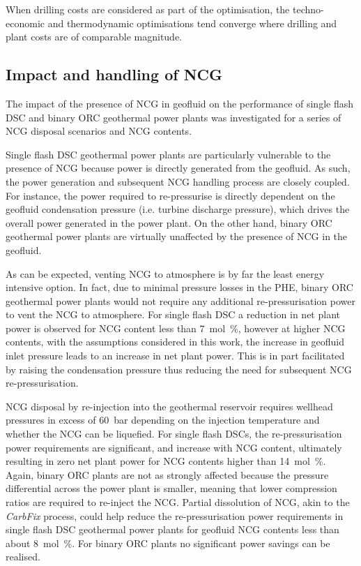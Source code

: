         When drilling costs are considered as part of the optimisation, the techno-economic and thermodynamic optimisations tend converge where drilling and plant costs are of comparable magnitude.
    
    \subsection{Impact and handling of NCG}
        The impact of the presence of \ac{NCG} in geofluid on the performance of single flash \ac{DSC} and binary \ac{ORC} geothermal power plants was investigated for a series of \ac{NCG} disposal scenarios and \ac{NCG} contents.

        Single flash \ac{DSC} geothermal power plants are particularly vulnerable to the presence of \ac{NCG} because power is directly generated from the geofluid. As such, the power generation and subsequent \ac{NCG} handling process are closely coupled. For instance, the power required to re-pressurise is directly dependent on the geofluid condensation pressure (i.e. turbine discharge pressure), which drives the overall power generated in the power plant. On the other hand, binary \ac{ORC} geothermal power plants are virtually unaffected by the presence of \ac{NCG} in the geofluid.

        As can be expected, venting \ac{NCG} to atmosphere is by far the least energy intensive option. In fact, due to minimal pressure losses in the \ac{PHE}, binary \ac{ORC} geothermal power plants would not require any additional re-pressurisation power to vent the \ac{NCG} to atmosphere. For single flash \ac{DSC} a reduction in net plant power is observed for \ac{NCG} content less than \qty{7}{\mol\percent}, however at higher \ac{NCG} contents, with the assumptions considered in this work, the increase in geofluid inlet pressure leads to an increase in net plant power. This is in part facilitated by raising the condensation pressure thus reducing the need for subsequent \ac{NCG} re-pressurisation. 

        \ac{NCG} disposal by re-injection into the geothermal reservoir requires wellhead pressures in excess of \qty{60}{\bar} depending on the injection temperature and whether the \ac{NCG} can be liquefied. For single flash \acp{DSC}, the re-pressurisation power requirements are significant, and increase with \ac{NCG} content, ultimately resulting in zero net plant power for \ac{NCG} contents higher than \qty{14}{\mol\percent}. Again, binary \ac{ORC} plants are not as strongly affected because the pressure differential across the power plant is smaller, meaning that lower compression ratios are required to re-inject the \ac{NCG}. Partial dissolution of \ac{NCG}, akin to the \emph{CarbFix} process, could help reduce the re-pressurisation power requirements in single flash \ac{DSC} geothermal power plants for geofluid \ac{NCG} contents less than about \qty{8}{\mol\percent}. For binary \ac{ORC} plants no significant power savings can be realised. 

